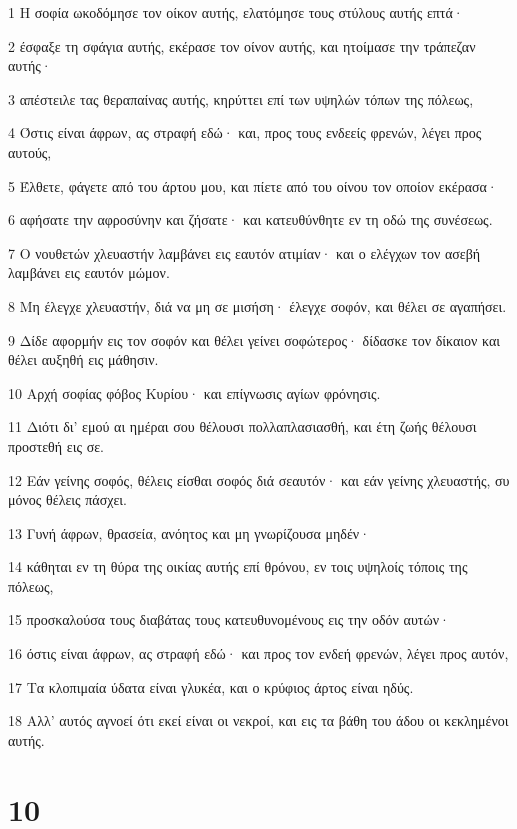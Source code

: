 \par 1 Η σοφία ωκοδόμησε τον οίκον αυτής, ελατόμησε τους στύλους αυτής επτά·
\par 2 έσφαξε τη σφάγια αυτής, εκέρασε τον οίνον αυτής, και ητοίμασε την τράπεζαν αυτής·
\par 3 απέστειλε τας θεραπαίνας αυτής, κηρύττει επί των υψηλών τόπων της πόλεως,
\par 4 Όστις είναι άφρων, ας στραφή εδώ· και, προς τους ενδεείς φρενών, λέγει προς αυτούς,
\par 5 Έλθετε, φάγετε από του άρτου μου, και πίετε από του οίνου τον οποίον εκέρασα·
\par 6 αφήσατε την αφροσύνην και ζήσατε· και κατευθύνθητε εν τη οδώ της συνέσεως.
\par 7 Ο νουθετών χλευαστήν λαμβάνει εις εαυτόν ατιμίαν· και ο ελέγχων τον ασεβή λαμβάνει εις εαυτόν μώμον.
\par 8 Μη έλεγχε χλευαστήν, διά να μη σε μισήση· έλεγχε σοφόν, και θέλει σε αγαπήσει.
\par 9 Δίδε αφορμήν εις τον σοφόν και θέλει γείνει σοφώτερος· δίδασκε τον δίκαιον και θέλει αυξηθή εις μάθησιν.
\par 10 Αρχή σοφίας φόβος Κυρίου· και επίγνωσις αγίων φρόνησις.
\par 11 Διότι δι' εμού αι ημέραι σου θέλουσι πολλαπλασιασθή, και έτη ζωής θέλουσι προστεθή εις σε.
\par 12 Εάν γείνης σοφός, θέλεις είσθαι σοφός διά σεαυτόν· και εάν γείνης χλευαστής, συ μόνος θέλεις πάσχει.
\par 13 Γυνή άφρων, θρασεία, ανόητος και μη γνωρίζουσα μηδέν·
\par 14 κάθηται εν τη θύρα της οικίας αυτής επί θρόνου, εν τοις υψηλοίς τόποις της πόλεως,
\par 15 προσκαλούσα τους διαβάτας τους κατευθυνομένους εις την οδόν αυτών·
\par 16 όστις είναι άφρων, ας στραφή εδώ· και προς τον ενδεή φρενών, λέγει προς αυτόν,
\par 17 Τα κλοπιμαία ύδατα είναι γλυκέα, και ο κρύφιος άρτος είναι ηδύς.
\par 18 Αλλ' αυτός αγνοεί ότι εκεί είναι οι νεκροί, και εις τα βάθη του άδου οι κεκλημένοι αυτής.

\chapter{10}

